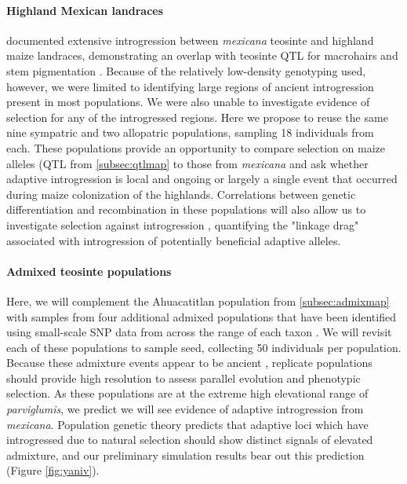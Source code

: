 \paragraph{Highland Mexican landraces}
\citet{Hufford2013} documented extensive introgression between \emph{mexicana} teosinte and highland maize landraces, demonstrating an overlap with teosinte QTL for macrohairs and stem pigmentation \citep{Lauter2004a}. Because of the relatively low-density genotyping used, however, we were limited to identifying large regions of ancient introgression present in most populations.  We were also unable to investigate evidence of selection for any of the introgressed regions.  Here we propose to reuse the same nine sympatric and two allopatric populations, sampling 18 individuals from each. These populations provide an opportunity to compare selection on maize alleles (QTL from \ref{subsec:qtlmap} to those from \emph{mexicana} and ask whether adaptive introgression is local and ongoing or largely a single event that occurred during maize colonization of the highlands. Correlations between genetic differentiation and recombination in these populations will also allow us to investigate selection against introgression \citep{Brandvain2013}, quantifying the "linkage drag" associated with introgression of potentially beneficial adaptive alleles.  

\paragraph{Admixed teosinte populations}
Here, we will complement the Ahuacatitlan population from \ref{subsec:admixmap} with samples from four additional admixed populations that have been identified using small-scale SNP data from across the range of each taxon \citep{vanheerwaarden2011a}.  We will revisit each of these populations to sample seed, collecting 50 individuals per population. Because these admixture events appear to be ancient \citep{Pyhajarvi2013}, replicate populations should provide high resolution to assess parallel evolution and phenotypic selection.  As these populations are at the extreme high elevational range of \emph{parviglumis}, we predict we will see evidence of adaptive introgression from \emph{mexicana}. Population genetic theory predicts that adaptive loci which have introgressed due to natural selection should show distinct signals of elevated admixture, and our preliminary simulation results bear out this prediction (Figure \ref{fig:yaniv}). 


